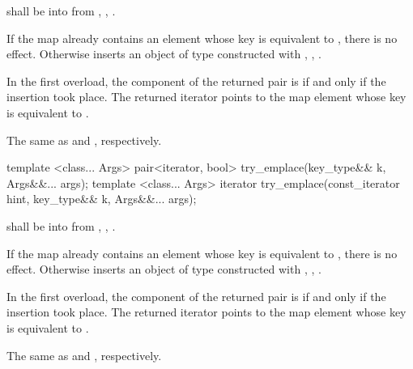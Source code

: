 \begin{itemdescr}
\pnum
\requires
{} shall be  into 
from , ,
.

\pnum
\effects
If the map already contains an element
whose key is equivalent to ,
there is no effect.
Otherwise inserts an object of type 
constructed with , ,
.

\pnum
\returns
In the first overload,
the  component of the returned pair is 
if and only if the insertion took place.
The returned iterator points to the map element
whose key is equivalent to .

\pnum
\complexity
The same as  and ,
respectively.
\end{itemdescr}

%
%
\begin{itemdecl}
template <class... Args> pair<iterator, bool> try_emplace(key_type&& k, Args&&... args);
template <class... Args> iterator try_emplace(const_iterator hint, key_type&& k, Args&&... args);
\end{itemdecl}

\begin{itemdescr}
\pnum
\requires
{} shall be  into 
from , ,
.

\pnum
\effects
If the map already contains an element
whose key is equivalent to ,
there is no effect.
Otherwise inserts an object of type 
constructed with , ,
.

\pnum
\returns
In the first overload,
the  component of the returned pair is 
if and only if the insertion took place.
The returned iterator points to the map element
whose key is equivalent to .

\pnum
\complexity
The same as  and ,
respectively.
\end{itemdescr}

